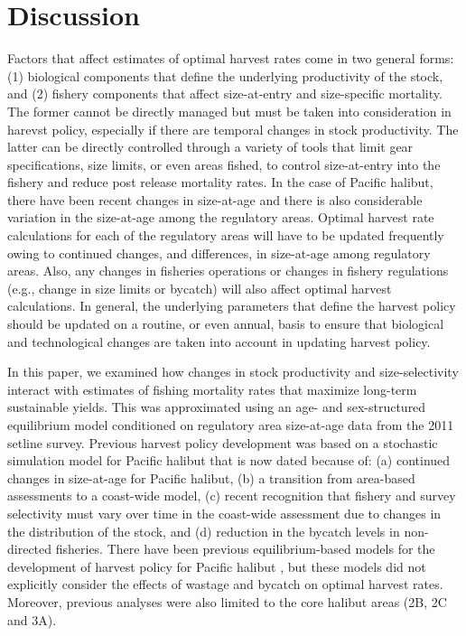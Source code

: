 

\section*{Discussion} %
\label{sec:discussion}

Factors that affect estimates of optimal harvest rates come in two general forms: (1) biological components that define the underlying productivity of the stock, and (2) fishery components that affect size-at-entry and size-specific mortality. The former cannot be directly managed but must be taken into consideration in harevst policy, especially if there are temporal changes in stock productivity.  The latter can be directly controlled through a variety of tools that limit gear specifications, size limits, or even areas fished, to control size-at-entry into the fishery and reduce post release mortality rates.  In the case of Pacific halibut, there have been recent changes in size-at-age and there is also considerable variation in the size-at-age among the regulatory areas. Optimal harvest rate calculations for each of the regulatory areas will have to be updated frequently owing to continued changes, and differences, in size-at-age among regulatory areas.  Also, any changes in fisheries operations or changes in fishery regulations (e.g., change in size limits or bycatch) will also affect optimal harvest calculations.  In general, the underlying parameters that define the harvest policy should be updated on a routine, or even annual, basis to ensure that biological and technological changes are taken into account in updating harvest policy.

In this paper, we examined how changes in stock productivity and size-selectivity interact with estimates of fishing mortality rates that maximize long-term sustainable yields.  This was approximated using an age- and sex-structured equilibrium model conditioned on regulatory area size-at-age data from the 2011 setline survey.  Previous harvest policy development was based on a stochastic simulation model for Pacific halibut that is now dated because of: (a) continued changes in size-at-age for Pacific halibut, (b) a transition from area-based assessments to a coast-wide model, (c) recent recognition that fishery and survey selectivity must vary over time in the coast-wide assessment due to changes in the distribution of the stock, and (d) reduction in the bycatch levels in non-directed fisheries.  There have been previous equilibrium-based models for the development of harvest policy for Pacific halibut \citep[e.g.,][]{clark1995re}, but these models did not explicitly consider the effects of wastage and bycatch on optimal harvest rates.  Moreover, previous analyses were also limited to the core halibut areas (2B, 2C and 3A).  


